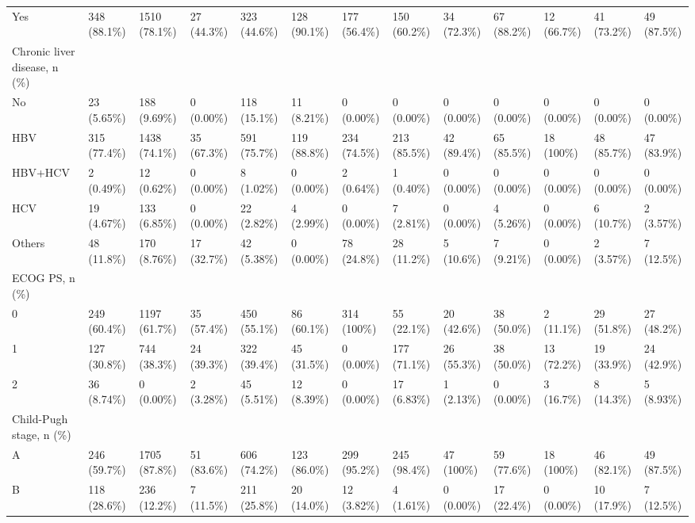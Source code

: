 \begin{landscape}
\begin{center}
\begin{longtable}{p{5.2cm}p{3.0cm}}
Yes & 348 (88.1\%) & 1510 (78.1\%) & 27 (44.3\%) & 323 (44.6\%) & 128 (90.1\%) & 177 (56.4\%) & 150 (60.2\%) & 34 (72.3\%) & 67 (88.2\%) & 12 (66.7\%) & 41 (73.2\%) & 49 (87.5\%) \\
Chronic liver disease, n (\%) &  &  &  &  &  &  &  &  &  &  &  &  \\
No & 23 (5.65\%) & 188 (9.69\%) & 0 (0.00\%) & 118 (15.1\%) & 11 (8.21\%) & 0 (0.00\%) & 0 (0.00\%) & 0 (0.00\%) & 0 (0.00\%) & 0 (0.00\%) & 0 (0.00\%) & 0 (0.00\%) \\
HBV & 315 (77.4\%) & 1438 (74.1\%) & 35 (67.3\%) & 591 (75.7\%) & 119 (88.8\%) & 234 (74.5\%) & 213 (85.5\%) & 42 (89.4\%) & 65 (85.5\%) & 18 (100\%) & 48 (85.7\%) & 47 (83.9\%) \\
HBV+HCV & 2 (0.49\%) & 12 (0.62\%) & 0 (0.00\%) & 8 (1.02\%) & 0 (0.00\%) & 2 (0.64\%) & 1 (0.40\%) & 0 (0.00\%) & 0 (0.00\%) & 0 (0.00\%) & 0 (0.00\%) & 0 (0.00\%) \\
HCV & 19 (4.67\%) & 133 (6.85\%) & 0 (0.00\%) & 22 (2.82\%) & 4 (2.99\%) & 0 (0.00\%) & 7 (2.81\%) & 0 (0.00\%) & 4 (5.26\%) & 0 (0.00\%) & 6 (10.7\%) & 2 (3.57\%) \\
Others & 48 (11.8\%) & 170 (8.76\%) & 17 (32.7\%) & 42 (5.38\%) & 0 (0.00\%) & 78 (24.8\%) & 28 (11.2\%) & 5 (10.6\%) & 7 (9.21\%) & 0 (0.00\%) & 2 (3.57\%) & 7 (12.5\%) \\
ECOG PS, n (\%) &  &  &  &  &  &  &  &  &  &  &  &  \\
0 & 249 (60.4\%) & 1197 (61.7\%) & 35 (57.4\%) & 450 (55.1\%) & 86 (60.1\%) & 314 (100\%) & 55 (22.1\%) & 20 (42.6\%) & 38 (50.0\%) & 2 (11.1\%) & 29 (51.8\%) & 27 (48.2\%) \\
1 & 127 (30.8\%) & 744 (38.3\%) & 24 (39.3\%) & 322 (39.4\%) & 45 (31.5\%) & 0 (0.00\%) & 177 (71.1\%) & 26 (55.3\%) & 38 (50.0\%) & 13 (72.2\%) & 19 (33.9\%) & 24 (42.9\%) \\
2 & 36 (8.74\%) & 0 (0.00\%) & 2 (3.28\%) & 45 (5.51\%) & 12 (8.39\%) & 0 (0.00\%) & 17 (6.83\%) & 1 (2.13\%) & 0 (0.00\%) & 3 (16.7\%) & 8 (14.3\%) & 5 (8.93\%) \\
Child-Pugh stage, n (\%) &  &  &  &  &  &  &  &  &  &  &  &  \\
A & 246 (59.7\%) & 1705 (87.8\%) & 51 (83.6\%) & 606 (74.2\%) & 123 (86.0\%) & 299 (95.2\%) & 245 (98.4\%) & 47 (100\%) & 59 (77.6\%) & 18 (100\%) & 46 (82.1\%) & 49 (87.5\%) \\
B & 118 (28.6\%) & 236 (12.2\%) & 7 (11.5\%) & 211 (25.8\%) & 20 (14.0\%) & 12 (3.82\%) & 4 (1.61\%) & 0 (0.00\%) & 17 (22.4\%) & 0 (0.00\%) & 10 (17.9\%) & 7 (12.5\%) \\

\end{longtable}
\end{center}
\end{landscape}

